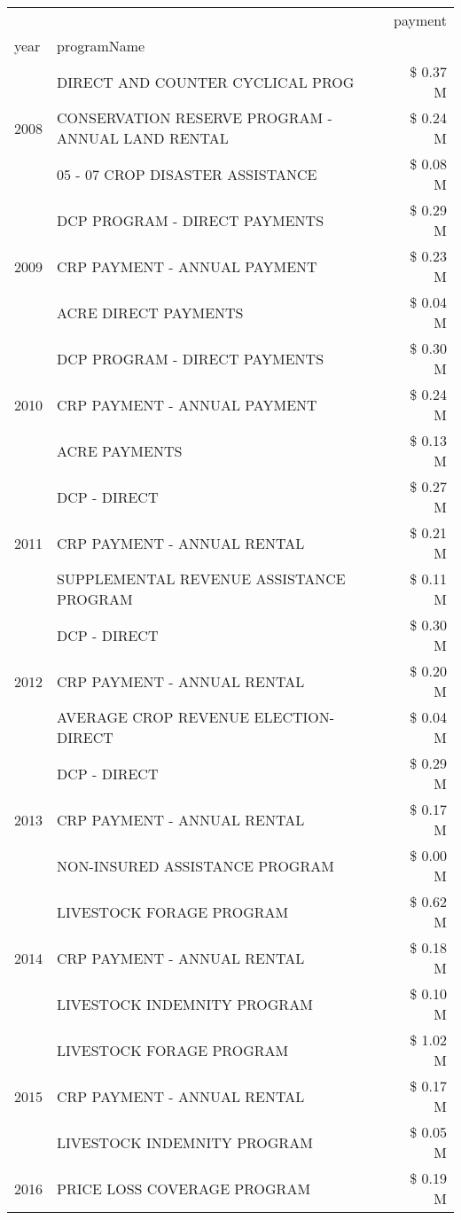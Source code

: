 \begin{tabular}{llr}
\toprule
 &  & payment \\
year & programName &  \\
\midrule
\multirow[t]{3}{*}{2008} & DIRECT AND COUNTER CYCLICAL PROG & \$ 0.37 M \\
 & CONSERVATION RESERVE PROGRAM - ANNUAL LAND RENTAL & \$ 0.24 M \\
 & 05 - 07 CROP DISASTER ASSISTANCE & \$ 0.08 M \\
\cline{1-3}
\multirow[t]{3}{*}{2009} & DCP PROGRAM - DIRECT PAYMENTS & \$ 0.29 M \\
 & CRP PAYMENT - ANNUAL PAYMENT & \$ 0.23 M \\
 & ACRE DIRECT PAYMENTS & \$ 0.04 M \\
\cline{1-3}
\multirow[t]{3}{*}{2010} & DCP PROGRAM - DIRECT PAYMENTS & \$ 0.30 M \\
 & CRP PAYMENT - ANNUAL PAYMENT & \$ 0.24 M \\
 & ACRE PAYMENTS & \$ 0.13 M \\
\cline{1-3}
\multirow[t]{3}{*}{2011} & DCP - DIRECT & \$ 0.27 M \\
 & CRP PAYMENT - ANNUAL RENTAL & \$ 0.21 M \\
 & SUPPLEMENTAL REVENUE ASSISTANCE PROGRAM & \$ 0.11 M \\
\cline{1-3}
\multirow[t]{3}{*}{2012} & DCP - DIRECT & \$ 0.30 M \\
 & CRP PAYMENT - ANNUAL RENTAL & \$ 0.20 M \\
 & AVERAGE CROP REVENUE ELECTION-DIRECT & \$ 0.04 M \\
\cline{1-3}
\multirow[t]{3}{*}{2013} & DCP - DIRECT & \$ 0.29 M \\
 & CRP PAYMENT - ANNUAL RENTAL & \$ 0.17 M \\
 & NON-INSURED ASSISTANCE PROGRAM & \$ 0.00 M \\
\cline{1-3}
\multirow[t]{3}{*}{2014} & LIVESTOCK FORAGE PROGRAM & \$ 0.62 M \\
 & CRP PAYMENT - ANNUAL RENTAL & \$ 0.18 M \\
 & LIVESTOCK INDEMNITY PROGRAM & \$ 0.10 M \\
\cline{1-3}
\multirow[t]{3}{*}{2015} & LIVESTOCK FORAGE PROGRAM & \$ 1.02 M \\
 & CRP PAYMENT - ANNUAL RENTAL & \$ 0.17 M \\
 & LIVESTOCK INDEMNITY PROGRAM & \$ 0.05 M \\
\cline{1-3}
\multirow[t]{3}{*}{2016} & PRICE LOSS COVERAGE PROGRAM & \$ 0.19 M \\

\end{tabular}
